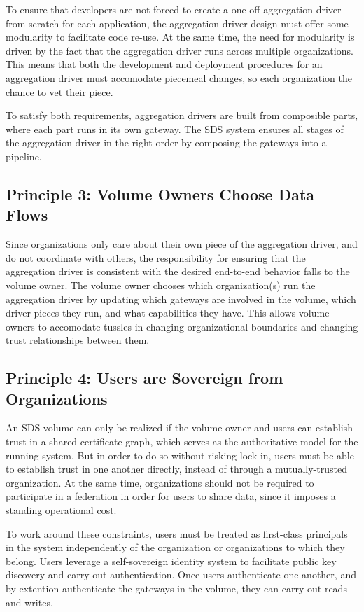 To ensure that developers
are not forced to create a one-off aggregation driver from scratch for each
application, the aggregation driver design must offer some modularity to
facilitate code re-use.  At the same time, the need for modularity is driven by
the fact that the aggregation driver runs across multiple organizations.
This means that both the development and deployment procedures for
an aggregation driver must accomodate piecemeal
changes, so each organization the chance to vet their piece.

To satisfy both requirements, aggregation drivers
are built from composible parts, where each part runs in its own gateway.
The SDS system ensures all stages of the aggregation driver in the right order
by composing the gateways into a pipeline.

\subsection{Principle 3: Volume Owners Choose Data Flows}

Since organizations only care about their own piece of the aggregation driver,
and do not coordinate with others, the responsibility for ensuring that the
aggregation driver is consistent with the desired end-to-end behavior falls to
the volume owner.  The volume owner chooses which
organization(s) run the aggregation driver by updating which gateways are
involved in the volume, which driver pieces they run, and what capabilities they
have.  This allows volume owners to accomodate tussles in changing
organizational boundaries and changing trust relationships between them.

\subsection{Principle 4: Users are Sovereign from Organizations}

An SDS volume can only be realized if the volume owner and users can establish
trust in a shared certificate graph, which serves as the authoritative model for
the running system.  But in order to do so without risking lock-in, users must
be able to establish trust in one another directly, instead of through a
mutually-trusted organization.  At the same time, organizations should not be
required to participate in a federation in order for users to share data, since
it imposes a standing operational cost.

To work around these constraints, users must be treated
as first-class principals in the system independently of the organization or
organizations to which they belong.  Users leverage a self-sovereign identity
system to facilitate public key discovery and carry out authentication.  Once
users authenticate one another, and by extention authenticate the gateways in
the volume, they can carry out reads and writes.

